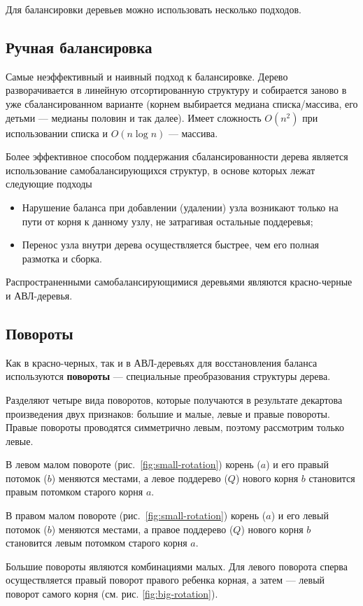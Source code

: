 Для балансировки деревьев можно использовать несколько подходов.
\subsection{Ручная балансировка}
Самые неэффективный и наивный подход к балансировке. Дерево разворачивается
в линейную отсортированную структуру и собирается заново в уже сбалансированном варианте
(корнем выбирается медиана списка/массива, его детьми --- медианы половин и так далее).
Имеет сложность $O(n^2)$ при использовании списка и $O(n\log n)$ --- массива.

Более эффективное способом поддержания сбалансированности дерева является использование
самобалансирующихся структур, в основе которых лежат следующие подходы
\begin{itemize}
  \item Нарушение баланса при добавлении (удалении) узла возникают только на пути от корня к данному узлу,
  не затрагивая остальные поддеревья;
  \item Перенос узла внутри дерева осуществляется быстрее, чем его полная размотка и сборка.
\end{itemize}

Распространенными самобалансирующимися деревьями являются красно-черные и АВЛ-деревья.

\subsection{Повороты}
\label{sec:rotations}
Как в красно-черных, так и в АВЛ-деревьях для восстановления баланса используются
\textbf{повороты} --- специальные преобразования структуры дерева.

Разделяют четыре вида поворотов, которые получаются в результате декартова произведения двух признаков:
большие и малые, левые и правые повороты. Правые повороты проводятся симметрично левым, поэтому рассмотрим
только левые.

В левом малом повороте (рис.~\ref{fig:small-rotation}) корень ($a$) и его правый потомок ($b$)
меняются местами, а левое поддерево ($Q$) нового корня $b$ становится правым потомком старого корня $a$.

В правом малом повороте (рис.~\ref{fig:small-rotation}) корень ($a$) и его левый потомок ($b$)
меняются местами, а правое поддерево ($Q$) нового корня $b$ становится левым потомком старого корня $a$.

Большие повороты являются комбинациями малых. Для левого поворота сперва осуществляется правый поворот
правого ребенка корная, а затем --- левый поворот самого корня (см. рис. \ref{fig:big-rotation}).

